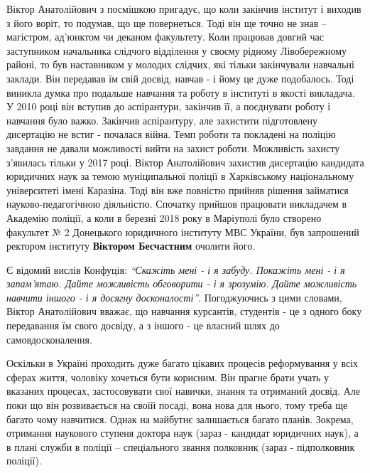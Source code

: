 
Віктор Анатолійович з посмішкою пригадує, що коли закінчив інститут і виходив з
його воріт, то подумав, що ще повернеться. Тоді він ще точно не знав –
магістром, ад'юнктом чи деканом факультету. Коли працював довгий час
заступником начальника слідчого відділення у своєму рідному Лівобережному
районі, то був наставником у молодих слідчих, які тільки закінчували навчальні
заклади. Він передавав їм свій досвід, навчав - і йому це дуже подобалось. Тоді
виникла думка про подальше навчання та роботу в інституті в якості викладача. У
2010 році він вступив до аспірантури, закінчив її, а поєднувати роботу і
навчання було важко. Закінчив аспірантуру, але захистити підготовлену
дисертацію не встиг - почалася війна. Темп роботи та покладені на поліцію
завдання не давали можливості вийти на захист роботи. Можливість захисту
з'явилась тільки у 2017 році. Віктор Анатолійович захистив дисертацію кандидата
юридичних наук за темою муніципальної поліції в Харківському національному
університеті імені Каразіна. Тоді він вже повністю прийняв рішення займатися
науково-педагогічною діяльністю. Спочатку прийшов працювати викладачем в
Академію поліції, а коли в березні 2018 року в  Маріуполі було створено
факультет № 2 Донецького юридичного інституту МВС України, був запрошений
ректором інституту \textbf{Віктором Бесчастним} очолити його.


Є відомий вислів Конфуція: \emph{\enquote{Скажіть мені - і я забуду. Покажіть мені - і я
запам'ятаю. Дайте можливість обговорити - і я зрозумію. Дайте можливість
навчити іншого - і я досягну досконалості}}. Погоджуючись з цими словами, Віктор
Анатолійович вважає, що навчання курсантів, студентів - це з одного боку
передавання їм свого досвіду, а з іншого - це власний шлях до
самовдосконалення.

Оскільки в Україні проходить дуже багато цікавих процесів реформування у всіх
сферах життя, чоловіку хочеться бути корисним. Він прагне брати учать у
вказаних процесах, застосовувати свої навички, знання та отриманий досвід. Але
поки що він розвивається на своїй посаді, вона нова для нього, тому треба ще
багато чому навчитися. Однак на майбутнє залишається багато планів. Зокрема,
отримання наукового ступеня доктора наук (зараз - кандидат юридичних наук), а в
плані служби в поліції – спеціального звання полковник (зараз - підполковник
поліції).

